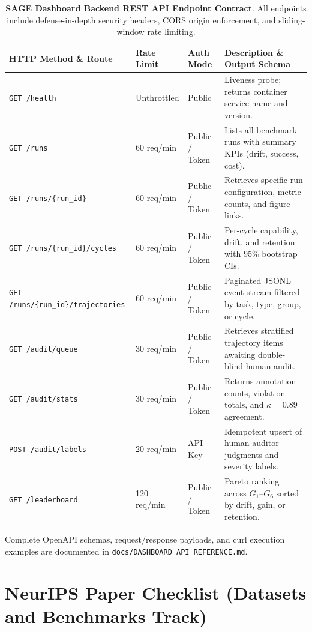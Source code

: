 \documentclass{article}
\begin{document}
\begin{table}[h]
\centering
\small
\caption{\textbf{SAGE Dashboard Backend REST API Endpoint Contract}. All endpoints include defense-in-depth security headers, CORS origin enforcement, and sliding-window rate limiting.}
\label{tab:backend_api_endpoints}
\begin{tabular}{llll}
\toprule
\textbf{HTTP Method \& Route} & \textbf{Rate Limit} & \textbf{Auth Mode} & \textbf{Description \& Output Schema} \\
\midrule
\texttt{GET /health} & Unthrottled & Public & Liveness probe; returns container service name and version. \\
\texttt{GET /runs} & 60 req/min & Public / Token & Lists all benchmark runs with summary KPIs (drift, success, cost). \\
\texttt{GET /runs/\{run\_id\}} & 60 req/min & Public / Token & Retrieves specific run configuration, metric counts, and figure links. \\
\texttt{GET /runs/\{run\_id\}/cycles} & 60 req/min & Public / Token & Per-cycle capability, drift, and retention with 95\% bootstrap CIs. \\
\texttt{GET /runs/\{run\_id\}/trajectories} & 60 req/min & Public / Token & Paginated JSONL event stream filtered by task, type, group, or cycle. \\
\texttt{GET /audit/queue} & 30 req/min & Public / Token & Retrieves stratified trajectory items awaiting double-blind human audit. \\
\texttt{GET /audit/stats} & 30 req/min & Public / Token & Returns annotation counts, violation totals, and $\kappa = 0.89$ agreement. \\
\texttt{POST /audit/labels} & 20 req/min & API Key & Idempotent upsert of human auditor judgments and severity labels. \\
\texttt{GET /leaderboard} & 120 req/min & Public / Token & Pareto ranking across $G_1$--$G_6$ sorted by drift, gain, or retention. \\
\bottomrule
\end{tabular}
\end{table}

Complete OpenAPI schemas, request/response payloads, and curl execution examples are documented in \texttt{docs/DASHBOARD\_API\_REFERENCE.md}.

\section{NeurIPS Paper Checklist (Datasets and Benchmarks Track)}
\label{sec:checklist}
\end{document}
